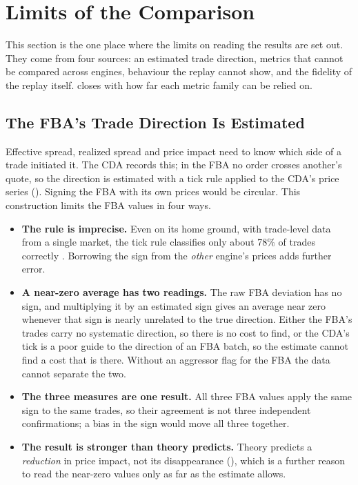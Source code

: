 \section{Limits of the Comparison}
\label{sec:metricreliability}

This section is the one place where the limits on reading the results are
set out. They come from four sources: an estimated trade direction, metrics
that cannot be compared across engines, behaviour the replay cannot show,
and the fidelity of the replay itself.  closes with how
far each metric family can be relied on.

\subsection{The FBA's Trade Direction Is Estimated}
\label{sec:limitssign}

Effective spread, realized spread and price impact need to know which side
of a trade initiated it. The CDA records this; in the FBA no order crosses
another's quote, so the direction is estimated with a tick rule applied to
the CDA's price series (). Signing the FBA with its own
prices would be circular. This construction limits the FBA values in four
ways.

\begin{itemize}
  \item \textbf{The rule is imprecise.} Even on its home ground, with
  trade-level data from a single market, the tick rule classifies only
  about 78\% of trades correctly \citep{ellis2000accuracy}. Borrowing the
  sign from the \emph{other} engine's prices adds further error.
  \item \textbf{A near-zero average has two readings.} The raw FBA deviation
  has no sign, and multiplying it by an estimated sign gives an average near
  zero whenever that sign is nearly unrelated to the true direction. Either
  the FBA's trades carry no systematic direction, so there is no cost to
  find, or the CDA's tick is a poor guide to the direction of an FBA batch,
  so the estimate cannot find a cost that is there. Without an aggressor
  flag for the FBA the data cannot separate the two.
  \item \textbf{The three measures are one result.} All three FBA values
  apply the same sign to the same trades, so their agreement is not three
  independent confirmations; a bias in the sign would move all three
  together.
  \item \textbf{The result is stronger than theory predicts.} Theory
  predicts a \emph{reduction} in price impact, not its disappearance
  (), which is a further reason to read the
  near-zero values only as far as the estimate allows.
\end{itemize}

